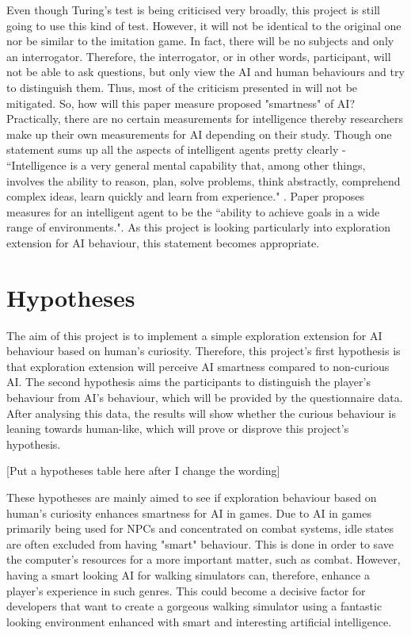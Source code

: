 \documentclass[journal]{IEEEtran}
\begin{document}
Even though Turing's test is being criticised very broadly, this project is still going to use this kind of test. However, it will not be identical to the original one nor be similar to the imitation game. In fact, there will be no subjects and only an interrogator. Therefore, the interrogator, or in other words, participant, will not be able to ask questions, but only view the AI and human behaviours and try to distinguish them. Thus, most of the criticism presented in \cite{hayes1995turing}\cite{sweeney2003s}\cite{crockett1994turing}\cite{livingstone2006turing} will not be mitigated. So, how will this paper measure proposed "smartness" of AI? Practically, there are no certain measurements for intelligence thereby researchers make up their own measurements for AI depending on their study. Though one statement sums up all the aspects of intelligent agents pretty clearly - ``Intelligence is a very general mental capability that, among other things, involves the ability to reason, plan, solve problems, think abstractly, comprehend complex ideas, learn quickly and learn from experience." \cite{gottfredson1997mainstream}. Paper \cite{legg2007universal} proposes measures for an intelligent agent to be the ``ability to achieve goals in a wide range of environments.". As this project is looking particularly into exploration extension for AI behaviour, this statement becomes appropriate. %

\section{Hypotheses}
The aim of this project is to implement a simple exploration extension for AI behaviour based on human's curiosity. Therefore, this project's first hypothesis is that exploration extension will perceive AI smartness compared to non-curious AI. The second hypothesis aims the participants to distinguish the player's behaviour from AI's behaviour, which will be provided by the questionnaire data. After analysing this data, the results will show whether the curious behaviour is leaning towards human-like, which will prove or disprove this project's hypothesis.%

[Put a hypotheses table here after I change the wording]

These hypotheses are mainly aimed to see if exploration behaviour based on human's curiosity enhances smartness for AI in games. Due to AI in games primarily being used for NPCs and concentrated on combat systems, idle states are often excluded from having "smart" behaviour. This is done in order to save the computer's resources for a more important matter, such as combat. However, having a smart looking AI for walking simulators can, therefore, enhance a player's experience in such genres. This could become a decisive factor for developers that want to create a gorgeous walking simulator using a fantastic looking environment enhanced with smart and interesting artificial intelligence. %
\end{document}
